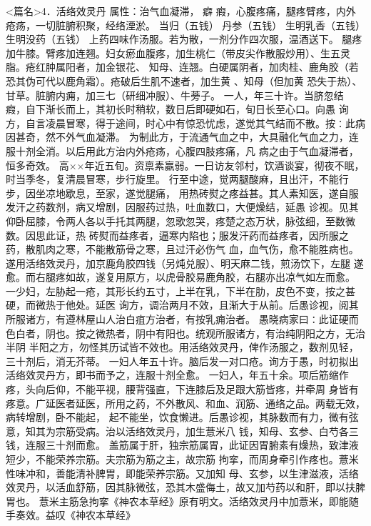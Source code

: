 \documentclass[a4paper,12pt,UTF8,twoside]{ctexbook}
\begin{document}
<篇名>4．活络效灵丹
属性：治气血凝滞， 癖 瘕，心腹疼痛，腿疼臂疼，内外疮疡，一切脏腑积聚，经络湮淤。 
当归（五钱） 丹参（五钱） 生明乳香（五钱） 生明没药（五钱） 
上药四味作汤服。若为散，一剂分作四次服，温酒送下。 
腿疼加牛膝。臂疼加连翘。妇女瘀血腹疼，加生桃仁（带皮尖作散服炒用）、生五灵脂。疮红肿属阳者，加金银花、 
知母、连翘。白硬属阴者，加肉桂、鹿角胶（若恐其伪可代以鹿角霜）。疮破后生肌不速者，加生黄 、知母（但加黄 
恐失于热）、甘草。脏腑内痈，加三七（研细冲服）、牛蒡子。 
一人，年三十许。当脐忽结 瘕，自下渐长而上，其初长时稍软，数日后即硬如石，旬日长至心口。向愚 
询方，自言凌晨冒寒，得于途间，时心中有惊恐忧虑，遂觉其气结而不散。按∶此病因甚奇，然不外气血凝滞。 
为制此方，于流通气血之中，大具融化气血之力，连服十剂全消。以后用此方治内外疮疡，心腹四肢疼痛，凡 
病之由于气血凝滞者，恒多奇效。 
高××年近五旬。资禀素羸弱。一日访友邻村，饮酒谈宴，彻夜不眠，时当季冬，复清晨冒寒，步行旋里。 
行至中途，觉两腿酸麻，且出汗，不能行步，因坐凉地歇息，至家，遂觉腿痛， 
用热砖熨之疼益甚。其人素知医，遂自服发汗之药数剂，病又增剧，因服药过热，吐血数口，大便燥结，延愚 
诊视。见其仰卧屈膝，令两人各以手托其两腿，忽歌忽哭，疼楚之态万状，脉弦细，至数微数。因思此证，热 
砖熨而益疼者，逼寒内陷也；服发汗药而益疼者，因所服之药，散肌肉之寒，不能散筋骨之寒，且过汗必伤气 
血，血气伤，愈不能胜病也。遂用活络效灵丹，加京鹿角胶四钱（另炖兑服）、明天麻二钱，煎汤饮下，左腿 
遂愈。而右腿疼如故，遂复用原方，以虎骨胶易鹿角胶，右腿亦出凉气如左而愈。 
一少妇，左胁起一疮，其形长约五寸，上半在乳，下半在肋，皮色不变，按之甚硬，而微热于他处。延医 
询方，调治两月不效，且渐大于从前。后愚诊视，阅其所服诸方，有遵林屋山人治白疽方治者，有按乳痈治者。 
愚晓病家曰∶此证硬而色白者，阴也。按之微热者，阴中有阳也。统观所服诸方，有治纯阴阳之方，无治半阴 
半阳之方，勿怪其历试皆不效也。用活络效灵丹，俾作汤服之，数剂见轻，三十剂后，消无芥蒂。 
一妇人年五十许。脑后发一对口疮。询方于愚，时初拟出活络效灵丹方，即书而予之，连服十剂全愈。 
一妇人，年五十余。项后筋缩作疼，头向后仰，不能平视，腰背强直，下连膝后及足跟大筋皆疼，并牵周 
身皆有疼意。广延医者延医，所用之药，不外散风、和血、润筋、通络之品。两载无效，病转增剧，卧不能起， 
起不能坐，饮食懒进。后愚诊视，其脉数而有力，微有弦意，知其为宗筋受病。治以活络效灵丹，加生薏米八 
钱，知母、玄参、白芍各三钱，连服三十剂而愈。 
盖筋属于肝，独宗筋属胃，此证因胃腑素有燥热，致津液短少，不能荣养宗筋。夫宗筋为筋之主，故宗筋 
拘挛，而周身牵引作疼也。薏米性味冲和，善能清补脾胃，即能荣养宗筋。又加知 
母、玄参，以生津滋液，活络效灵丹，以活血舒筋，因其脉微弦，恐其木盛侮土，故又加芍药以和肝，即以扶脾胃也。 
薏米主筋急拘挛《神农本草经》原有明文。活络效灵丹中加薏米，即能随手奏效。益叹《神农本草经》 
\end{document}
